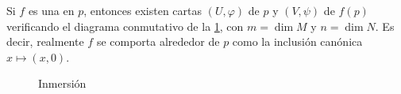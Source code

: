 \documentclass[../VD.tex]{subfiles}
\begin{document}
\begin{theorem}
  Si \(f\) es una  en \(p\), entonces existen cartas
  \((U,\varphi)\) de \(p\) y \((V,\psi)\) de \(f(p)\) verificando el diagrama
  conmutativo de la \cref{fig:inmersion-cd}, con \(m =
  \dim M\) y \(n = \dim N\). Es decir, realmente \(f\) se comporta alrededor de
  \(p\) como la inclusión canónica \(x \mapsto (x,0)\).

  \begin{figure}[h]
    \centering
    \caption{Inmersión}
    \label{fig:inmersion-cd}
  \end{figure}
\end{theorem}
\end{document}
